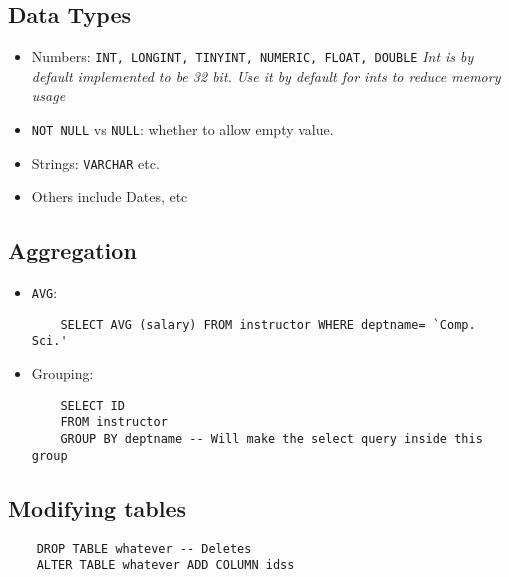 \documentclass[12pt]{article}
\begin{document}
\subsection*{Data Types}
\begin{itemize}
    \item Numbers: \texttt{INT, LONGINT, TINYINT, NUMERIC, FLOAT, DOUBLE} \newline
        \textit{Int is by default implemented to be 32 bit. Use it by default for ints to reduce memory usage}
    \item \texttt{NOT NULL} vs \texttt{NULL}: whether to allow empty value.
    \item Strings: \texttt{VARCHAR} etc.
    \item Others include Dates, etc
\end{itemize}
\subsection*{Aggregation} 
\begin{itemize}
    \item \texttt{AVG}: 
        \begin{lstlisting}
    SELECT AVG (salary) FROM instructor WHERE deptname= `Comp. Sci.'
        \end{lstlisting}
    \item Grouping: 
        \begin{lstlisting}
    SELECT ID
    FROM instructor
    GROUP BY deptname -- Will make the select query inside this group
        \end{lstlisting}
\end{itemize}
\subsection*{Modifying tables}
\begin{lstlisting}
    DROP TABLE whatever -- Deletes
    ALTER TABLE whatever ADD COLUMN idss
\end{lstlisting}
\end{document}
